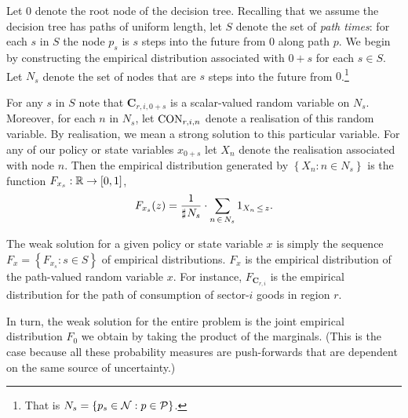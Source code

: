 \documentclass[12pt,a4paper,twoside, draft]{article}
\begin{document}
Let $\mathfrak{0}$ denote the root node of the decision tree.
Recalling that we assume the decision tree has paths of uniform length, let $S$
denote the set of \emph{path times}: for each $s$ in $S$ the node $p_s$ is $s$
steps into the future from $\mathfrak{0}$ along path $p$.
We begin by constructing the empirical distribution associated with
$\mathfrak{0} + s$ for each $s \in S$.
Let $N_s$ denote the set of nodes that are $s$ steps into the future from
$\mathfrak{0}$.\footnote{
   That is $N_{s} = \left\{ p_{s} \in \mathcal N : p \in \mathcal P\right\}$.
}

For any $s$ in $S$ note that $\mathbf{C}_{r, i, \mathfrak{0} + s}$ is a
scalar-valued random variable on $N_s$. 
Moreover, for each $n$ in $N_s$, let $\textup{CON}_{r, i, n}$ denote a
realisation of this random variable.
By realisation, we mean a strong solution to this particular variable.
For any of our policy or state variables $x_{\mathfrak{0}+s}$ let $X_n$ denote
the realisation associated with node $n$.
Then the empirical distribution generated by $\left\{X_n: n \in N_s\right\}$ is
the function
$F_{x_{s}} : \mathbb R \rightarrow [0, 1]$,
\begin{equation}\label{eq-empirical-dbn}
   F_{x_s}(z) = \frac{1}{\mathbin{\sharp}\hskip1pt N_{s}}
   \cdot \sum_{n \,\in\, N_{s}} 1_{X_n \,\leq\, z}.
\end{equation}

The weak solution for a given policy or state variable $x$ is simply the
sequence $F_{x} = \left\{F_{x_{s}}: s \in S\right\}$ of empirical distributions.
$F_{x}$ is the empirical distribution of the path-valued random variable $x$.
For instance, $F_{\mathbf{C}_{r, i}}$ is the empirical distribution for the
path of consumption of sector-$i$ goods in region $r$.

In turn, the weak solution for the entire problem is the joint empirical
distribution $F_{\mathfrak{0}}$ we obtain by taking the product of the
marginals.
(This is the case because all these probability measures are push-forwards that
are dependent on the same source of uncertainty.)
\end{document}
